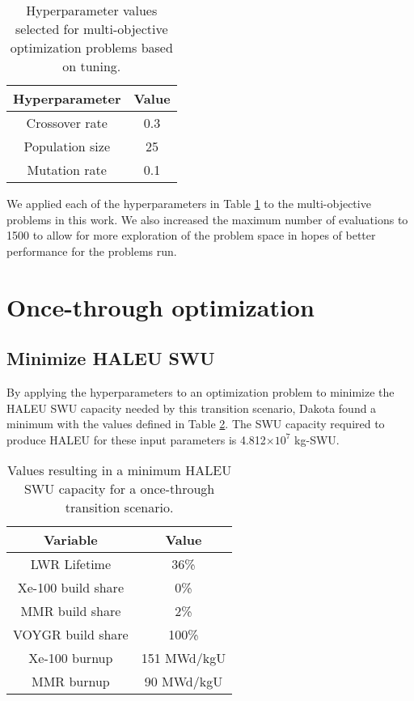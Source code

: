 \begin{table}
    \centering 
    \caption{Hyperparameter values selected for multi-objective 
    optimization problems based on tuning.}
    \label{tab:moga_parameters}
    \begin{tabular}{c c}
        \hline
        Hyperparameter & Value \\
        \hline
        Crossover rate & 0.3\\
        Population size & 25\\
        Mutation rate & 0.1\\
        \hline
    \end{tabular}
\end{table}

We applied each of the hyperparameters in Table \ref{tab:moga_parameters}
to the multi-objective problems in this work. We also increased the 
maximum number of evaluations to 1500 to allow for more exploration 
of the problem space in hopes of better performance for the problems 
run. 

\section{Once-through optimization}
\subsection{Minimize HALEU SWU}
By applying the hyperparameters to an optimization problem to minimize the 
\gls{HALEU} \gls{SWU} capacity needed by this transition scenario, Dakota
found a minimum with the values defined in Table \ref{tab:soga_ot_haleu}.
The \gls{SWU} capacity required to produce \gls{HALEU} for these input 
parameters is 4.812$\times 10^7$ kg-SWU.

\begin{table}
    \centering 
    \caption{Values resulting in a minimum \gls{HALEU} \gls{SWU} capacity for 
              a once-through transition scenario.}
    \label{tab:soga_ot_haleu}
    \begin{tabular}{c c}
        \hline
        Variable & Value \\
        \hline
        LWR Lifetime & 36\%\\
        Xe-100 build share & 0\%\\
        MMR build share & 2\%\\
        VOYGR build share & 100\%\\
        Xe-100 burnup & 151 MWd/kgU\\
        MMR burnup & 90 MWd/kgU\\
        \hline
    \end{tabular}
\end{table}

